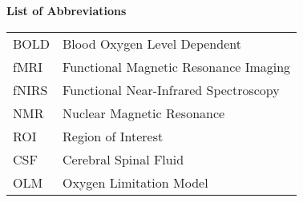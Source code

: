 \begin{center}
  {\normalsize\bfseries List of Abbreviations}
\end{center}
\vspace{\cftafterloftitleskip}
\begin{table*}[h]
    \setlength{\extrarowheight}{10pt}
    \begin{tabular*}{\linewidth}{l l}
      BOLD   & Blood Oxygen Level Dependent           \\
      fMRI   & Functional Magnetic Resonance Imaging  \\
      fNIRS  & Functional Near-Infrared Spectroscopy  \\
      NMR    & Nuclear Magnetic Resonance             \\
      ROI    & Region of Interest                     \\
      CSF    & Cerebral Spinal Fluid                  \\
      OLM    & Oxygen Limitation Model                \\
    \end{tabular*}
\end{table*}